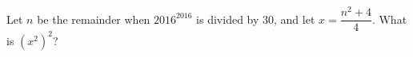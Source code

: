 Let $n$ be the remainder when $2016^{2016}$ is divided by $30$, and let $x=\dfrac{n^2+4}{4}$. What is $\left(x^2\right)^2$?
